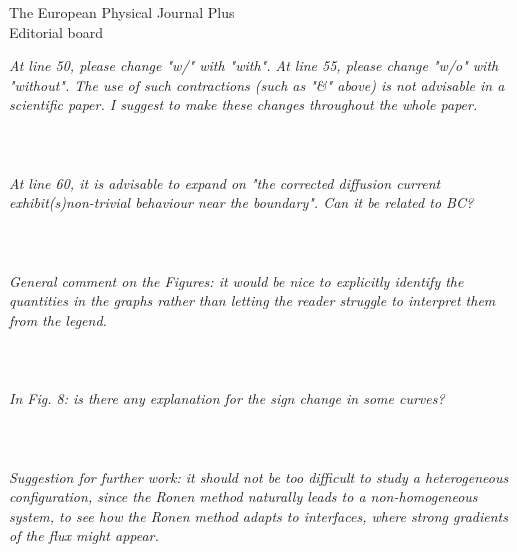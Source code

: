 \documentclass[11pt]{letter} %
\newcommand{\revised}[1]{{\color{red}{#1}}}
\begin{document}
\begin{letter}{The European Physical Journal Plus \\
Editorial board}
\newpage

\textit{At line 50, please change "w/" with "with". At line 55, please change "w/o" with "without". The use of such contractions (such as "\&" above) is not advisable in a scientific paper. I suggest to make these changes throughout the whole paper.}
\\ \\
\revised{T}
\\ \\
\textit{At line 60, it is advisable to expand on "the corrected diffusion current exhibit(s)non-trivial behaviour near the boundary". Can it be related to BC?}
\\ \\
\revised{T}
\\ \\
\textit{General comment on the Figures: it would be nice to explicitly identify the quantities in the graphs rather than letting the reader struggle to interpret them from the legend.}
\\ \\
\revised{T}
\\ \\
\textit{In Fig. 8: is there any explanation for the sign change in some curves?}
\\ \\
\revised{T}
\\ \\
\textit{Suggestion for further work: it should not be too difficult to study a heterogeneous configuration, since the Ronen method naturally leads to a non-homogeneous system, to see how the Ronen method adapts to interfaces, where strong gradients of the flux might appear.}
\\ \\
\revised{T}
\\ \\






%

\end{letter}
\end{document}
